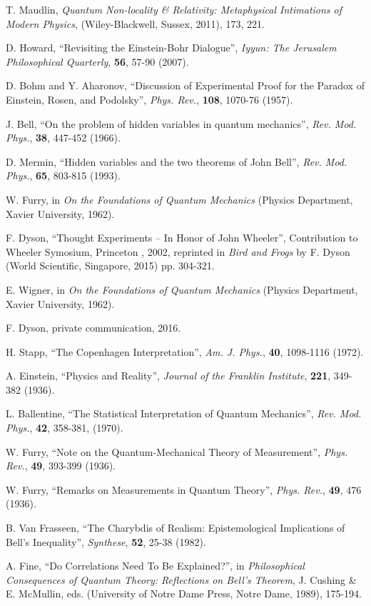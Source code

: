 \documentclass[12pt]{article}
\begin{document}
\begin{thebibliography}{99}
 T. Maudlin, {\it Quantum Non-locality \& Relativity: Metaphysical Intimations of Modern Physics}, (Wiley-Blackwell, Sussex, 2011), 173, 221.

 D. Howard, ``Revisiting the Einstein-Bohr Dialogue'', {\it Iyyun: The Jerusalem Philosophical Quarterly}, \textbf{56}, 57-90 (2007).

 D. Bohm and Y. Aharonov, ``Discussion of Experimental Proof for the Paradox of Einstein, Rosen, and Podolsky'', {\it Phys. Rev.}, \textbf{108}, 1070-76 (1957).

 J. Bell, ``On the problem of hidden variables in quantum mechanics'', {\it Rev. Mod. Phys.}, \textbf{38}, 447-452 (1966).

 D. Mermin, ``Hidden variables and the two theorems of John Bell'', {\it Rev. Mod. Phys.}, \textbf{65}, 803-815 (1993).

 W. Furry, in {\it On the Foundations of Quantum Mechanics} (Physics Department, Xavier University, 1962).

 F. Dyson, ``Thought Experiments -- In Honor of John Wheeler'', Contribution to Wheeler Symosium, Princeton , 2002, reprinted in {\it Bird and Frogs} by F. Dyson (World Scientific, Singapore, 2015) pp. 304-321.

 E. Wigner, in {\it On the Foundations of Quantum Mechanics} (Physics Department, Xavier University, 1962).

 F. Dyson, private communication, 2016.

 H. Stapp, ``The Copenhagen Interpretation'', {\it Am. J. Phys.}, \textbf{40}, 1098-1116 (1972).

 A. Einstein, ``Physics and Reality'', {\it Journal of the Franklin Institute}, \textbf{221}, 349-382 (1936).

 L. Ballentine, ``The Statistical Interpretation of Quantum Mechanics'', {\it Rev. Mod. Phys.}, \textbf{42}, 358-381, (1970).

 W. Furry, ``Note on the Quantum-Mechanical Theory of Measurement'', {\it Phys. Rev.}, \textbf{49}, 393-399 (1936).

 W. Furry, ``Remarks on Measurements in Quantum Theory'', {\it Phys. Rev.}, \textbf{49}, 476 (1936).

 B. Van Frasseen, ``The Charybdis of Realism: Epistemological Implications of Bell's Inequality'', {\it Synthese}, \textbf{52}, 25-38 (1982).

 A. Fine, ``Do Correlations Need To Be Explained?'', in {\it Philosophical Consequences of Quantum Theory: Reflections on Bell's Theorem}, J. Cushing \& E. McMullin, eds. (University of Notre Dame Press, Notre Dame, 1989), 175-194.

\end{thebibliography}
\end{document}
